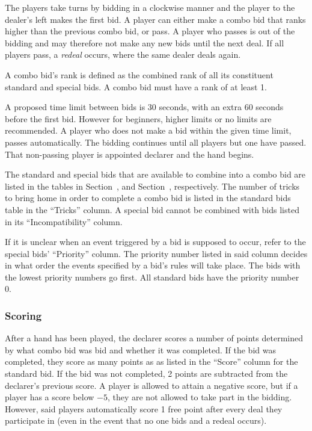 \documentclass[a4paper]{article} %
\begin{document}
	The players take turns by bidding in a clockwise manner and the player to the dealer's left makes the first bid. A player can either make a combo bid that ranks higher than the previous combo bid, or pass. A player who passes is out of the bidding and may therefore not make any new bids until the next deal. If all players pass, a \emph{redeal} occurs, where the same dealer deals again.

	A combo bid's rank is defined as the combined rank of all its constituent standard and special bids. A combo bid must have a rank of at least 1.

	A proposed time limit between bids is 30 seconds, with an extra 60 seconds before the first bid. However for beginners, higher limits or no limits are recommended. A player who does not make a bid within the given time limit, passes automatically. The bidding continues until all players but one have passed. That non-passing player is appointed declarer and the hand begins.

	The standard and special bids that are available to combine into a combo bid are listed in the tables in Section~, and Section~, respectively. The number of tricks to bring home in order to complete a combo bid is listed in the standard bids table in the ``Tricks'' column. A special bid cannot be combined with bids listed in its ``Incompatibility'' column.

	If it is unclear when an event triggered by a bid is supposed to occur, refer to the special bids' ``Priority'' column. The priority number listed in said column decides in what order the events specified by a bid's rules will take place. The bids with the lowest priority numbers go first. All standard bids have the priority number 0.

	\subsubsection{Scoring}
	After a hand has been played, the declarer scores a number of points determined by what combo bid was bid and whether it was completed. If the bid was completed, they score as many points as as listed in the ``Score'' column for the standard bid. If the bid was not completed, 2 points are subtracted from the declarer's previous score. A player is allowed to attain a negative score, but if a player has a score below $-5$, they are not allowed to take part in the bidding. However, said players automatically score 1 free point after every deal they participate in (even in the event that no one bids and a redeal occurs).
\end{document}
